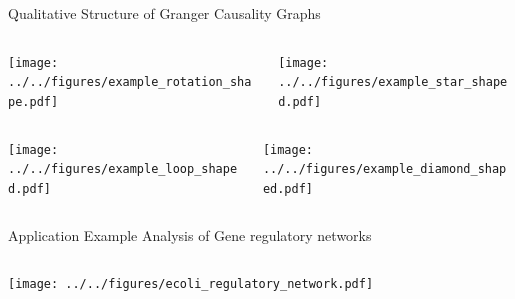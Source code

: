 \documentclass{beamer} %
\begin{document}

  


\begin{frame}{Qualitative Structure of Granger Causality Graphs}
  \begin{columns}
    \begin{column}{0.35\linewidth}
      \texttt{[image: ../../figures/example\_rotation\_shape.pdf]}\pause
    \end{column}
    \begin{column}{0.35\linewidth}
      \texttt{[image: ../../figures/example\_star\_shaped.pdf]}\pause
    \end{column}
  \end{columns}

  \begin{columns}
    \begin{column}{0.35\linewidth}
      \texttt{[image: ../../figures/example\_loop\_shaped.pdf]}\pause
    \end{column}
    \begin{column}{0.35\linewidth}
      \texttt{[image: ../../figures/example\_diamond\_shaped.pdf]}
    \end{column}
  \end{columns}
\end{frame}

\begin{frame}{Application Example}
  Analysis of Gene regulatory networks
  
  \begin{columns}
    \begin{column}{0.5\linewidth}
      \texttt{[image: ../../figures/ecoli\_regulatory\_network.pdf]}
    \end{column}
  \end{columns}

\end{frame}
\end{document}
